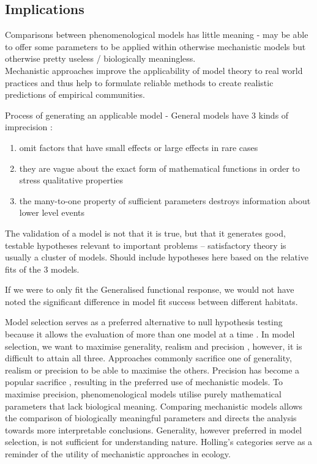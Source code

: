 \documentclass[11pt]{article}
\begin{document}
            \subsection{Implications}
            
                Comparisons between phenomenological models has little meaning - may be able to offer some parameters to be applied within otherwise mechanistic models but otherwise pretty useless / biologically meaningless.\\
                Mechanistic approaches improve the applicability of model theory to real world practices and thus help to formulate reliable methods to create realistic predictions of empirical communities. 

                Process of generating an applicable model - General models have 3 kinds of imprecision \citep{levins1966strategy}:
                \begin{enumerate}
                    \item omit factors that have small effects or large effects in rare cases
                    \item they are vague about the exact form of mathematical functions in order to stress qualitative properties
                    \item the many-to-one property of sufficient parameters destroys information about lower level events
                \end{enumerate}

                The validation of a model is not that it is true, but that it generates good, testable hypotheses relevant to important problems – satisfactory theory is usually a cluster of models. Should include hypotheses here based on the relative fits of the 3 models.

                If we were to only fit the Generalised functional response, we would not have noted the significant difference in model fit success between different habitats.

                Model selection serves as a preferred alternative to null hypothesis testing because it allows the evaluation of more than one model at a time \citep{johnson2004model}.
                In model selection, we want to maximise generality, realism and precision \citep{levins1966strategy}, however, it is difficult to attain all three. Approaches commonly sacrifice one of generality, realism or precision to be able to maximise the others. Precision has become a popular sacrifice \citep{levins1966strategy}, resulting in the preferred use of mechanistic models. To maximise precision, phenomenological models utilise purely mathematical parameters that lack biological meaning. Comparing mechanistic models allows the comparison of biologically meaningful parameters and directs the analysis towards more interpretable conclusions. Generality, however preferred in model selection, is not sufficient for understanding nature. Holling's categories serve as a reminder of the utility of mechanistic approaches in ecology. 
\end{document}
